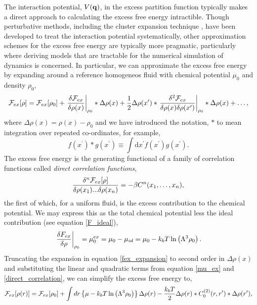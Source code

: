 The interaction potential, $V(\mathbf{q})$, in the excess partition function typically
makes a direct approach to calculating the excess free energy intractible.
Though perturbative methods, including the cluster expansion technique
\cite{MAYER41}, have been developed to treat the interaction potential
systematically, other approximation schemes for the excess free energy are
typically more pragmatic, particularly where deriving models that are tractable
for the numerical simulation of dynamics is concerned.  In particular, we can
approximate the excess free energy by expanding around a reference homogeneos
fluid with chemical potential $\mu_0$ and density $\rho_0$,
%
\begin{equation}
    \label{fex_expansion}
    \mathcal{F}_{ex}[\rho] = \mathcal{F}_{ex}[\rho_0]
        + \left . \frac{\delta \mathcal{F}_{ex}}{\delta\rho(x)} \right\vert_{\rho_0} \ast \Delta\rho(x) 
        + \frac{1}{2} \Delta\rho(x^\prime) \ast
            \left . \frac{\delta^2 \mathcal{F}_{ex}}{\delta\rho(x)\delta\rho(x^\prime)}
            \right\vert_{\rho_0} \ast \Delta\rho(x) 
        + \dots,
\end{equation}
%
where $\Delta\rho(x) = \rho(x) - \rho_0$ and we have introduced the notation,
$\ast$ to mean integration over repeated co-ordinates, for example,
%
\begin{equation}
    f(x^\prime) \ast g(x^\prime)
        \equiv \int\mathrm{d}x^\prime f(x^\prime) g(x^\prime).
\end{equation}
%
The excess free energy is the generating functional of a family of correlation
functions called \textit{direct correlation functions}, 
%
\begin{equation}
    \label{direct_correlation}
    \frac{\delta^n \mathcal{F}_{ex}[\rho]}{\delta \rho(x_1) ... \delta \rho(x_n)}
        = -\beta C^{n}(x_1, \dots, x_n),
\end{equation}
%
the first of which, for a uniform fluid, is the excess contribution to the
chemical potential. We may express  this as the total chemical potential less
the ideal contribution (see equation \ref{F_ideal}), 
%
\begin{equation}
    \label{mu_ex}
    \left.\frac{\delta F_{ex}}{\delta \rho}\right\vert_{\rho_0}
        = \mu_0^{ex}
        = \mu_0 - \mu_{id} 
        = \mu_0 - k_bT\ln\left(\Lambda^3 \rho_0\right).
\end{equation}
%
Truncating the expansion in equation \ref{fex_expansion} to second order in
$\Delta\rho(x)$ and substituting the linear and quadratic terms from  equation
\ref{mu_ex} and \ref{direct_correlation}, we can simplify the excess free
energy to,
%
\begin{equation}
    \label{F_ex}
    \mathcal{F}_{ex}[\rho(r)] = \mathcal{F}_{ex}[\rho_0] 
        + \int dr 
            \left\lbrace\mu - k_bT \ln\left(\Lambda^3 \rho_0 \right)
            \right\rbrace \Delta\rho(r)
        - \frac{k_b T}{2} \Delta\rho(r) \ast C^{(2)}_0(r, r^\prime) 
            \ast \Delta\rho(r^\prime),
\end{equation}
